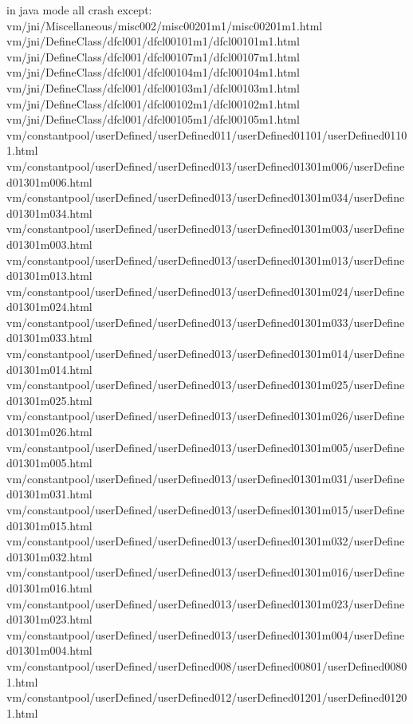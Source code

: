in java mode all crash except:
vm/jni/Miscellaneous/misc002/misc00201m1/misc00201m1.html
vm/jni/DefineClass/dfcl001/dfcl00101m1/dfcl00101m1.html
vm/jni/DefineClass/dfcl001/dfcl00107m1/dfcl00107m1.html
vm/jni/DefineClass/dfcl001/dfcl00104m1/dfcl00104m1.html
vm/jni/DefineClass/dfcl001/dfcl00103m1/dfcl00103m1.html
vm/jni/DefineClass/dfcl001/dfcl00102m1/dfcl00102m1.html
vm/jni/DefineClass/dfcl001/dfcl00105m1/dfcl00105m1.html
vm/constantpool/userDefined/userDefined011/userDefined01101/userDefined01101.html
vm/constantpool/userDefined/userDefined013/userDefined01301m006/userDefined01301m006.html
vm/constantpool/userDefined/userDefined013/userDefined01301m034/userDefined01301m034.html
vm/constantpool/userDefined/userDefined013/userDefined01301m003/userDefined01301m003.html
vm/constantpool/userDefined/userDefined013/userDefined01301m013/userDefined01301m013.html
vm/constantpool/userDefined/userDefined013/userDefined01301m024/userDefined01301m024.html
vm/constantpool/userDefined/userDefined013/userDefined01301m033/userDefined01301m033.html
vm/constantpool/userDefined/userDefined013/userDefined01301m014/userDefined01301m014.html
vm/constantpool/userDefined/userDefined013/userDefined01301m025/userDefined01301m025.html
vm/constantpool/userDefined/userDefined013/userDefined01301m026/userDefined01301m026.html
vm/constantpool/userDefined/userDefined013/userDefined01301m005/userDefined01301m005.html
vm/constantpool/userDefined/userDefined013/userDefined01301m031/userDefined01301m031.html
vm/constantpool/userDefined/userDefined013/userDefined01301m015/userDefined01301m015.html
vm/constantpool/userDefined/userDefined013/userDefined01301m032/userDefined01301m032.html
vm/constantpool/userDefined/userDefined013/userDefined01301m016/userDefined01301m016.html
vm/constantpool/userDefined/userDefined013/userDefined01301m023/userDefined01301m023.html
vm/constantpool/userDefined/userDefined013/userDefined01301m004/userDefined01301m004.html
vm/constantpool/userDefined/userDefined008/userDefined00801/userDefined00801.html
vm/constantpool/userDefined/userDefined012/userDefined01201/userDefined01201.html